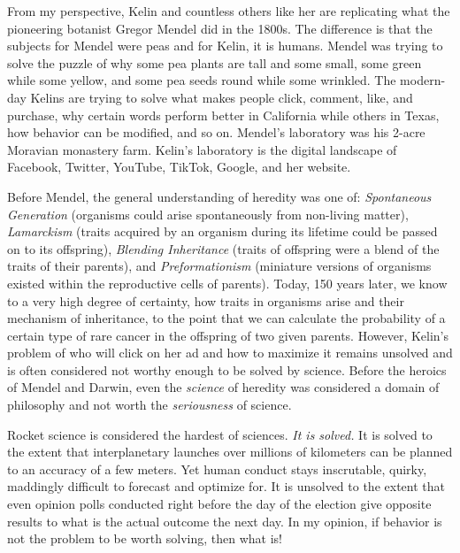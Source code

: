 \documentclass[PhD]{iiitd}
\begin{document}
From my perspective, Kelin and countless others like her are replicating what the pioneering botanist Gregor Mendel did in the 1800s. The difference is that the subjects for Mendel were peas and for Kelin, it is humans. Mendel was trying to solve the puzzle of why some pea plants are tall and some small, some green while some yellow, and some pea seeds round while some wrinkled. The modern-day Kelins are trying to solve what makes people click, comment, like, and purchase, why certain words perform better in California while others in Texas, how behavior can be modified, and so on. Mendel's laboratory was his 2-acre Moravian monastery farm. Kelin's laboratory is the digital landscape of Facebook, Twitter, YouTube, TikTok, Google, and her website. 

Before Mendel, the general understanding of heredity was one of: \textit{Spontaneous Generation} (organisms could arise spontaneously from non-living matter), \textit{Lamarckism} (traits acquired by an organism during its lifetime could be passed on to its offspring), \textit{Blending Inheritance} (traits of offspring were a blend of the traits of their parents), and \textit{Preformationism} (miniature versions of organisms existed within the reproductive cells of parents). Today, 150 years later, we know to a very high degree of certainty, how traits in organisms arise and their mechanism of inheritance, to the point that we can calculate the probability of a certain type of rare cancer in the offspring of two given parents. However, Kelin's problem of who will click on her ad and how to maximize it remains unsolved and is often considered not worthy enough to be solved by science. Before the heroics of Mendel and Darwin, even the \textit{science} of heredity was considered a domain of philosophy and not worth the \textit{seriousness} of science. 


Rocket science is considered the hardest of sciences. \textit{It is solved.} It is solved to the extent that interplanetary launches over millions of kilometers can be planned to an accuracy of a few meters. Yet human conduct stays inscrutable, quirky, maddingly difficult to forecast and optimize for. It is unsolved to the extent that even opinion polls conducted right before the day of the election give opposite results to what is the actual outcome the next day. In my opinion, if behavior is not the problem to be worth solving, then what is!




\end{document}
